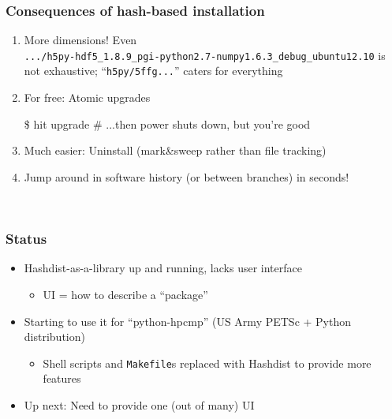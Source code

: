 \documentclass[sans,mathserif]{beamer}
\begin{document}
\begin{frame}[fragile]
  \frametitle{Consequences of hash-based installation}
  \begin{enumerate}
  \item<+-> More dimensions! Even \\
{\footnotesize
{\tt .../h5py-hdf5\_1.8.9\_pgi-python2.7-numpy1.6.3\_debug\_ubuntu12.10}
}
is not exhaustive; ``{\tt h5py/5ffg...}'' caters for everything

  \item<+-> For free: Atomic upgrades
\begin{semiverbatim}
\$ hit upgrade
# ...then power shuts down, but you're good
\end{semiverbatim}

  \item<+-> Much easier: Uninstall (mark\&sweep rather than file tracking)

  \item<+-> Jump around in software history (or between branches) in seconds!


  \end{enumerate}

~

\end{frame}


\begin{frame}
  \frametitle{Status}
  \begin{itemize}
  \item<+-> Hashdist-as-a-library up and running, lacks user interface
    \begin{itemize}
    \item UI = how to describe a ``package''
    \end{itemize}
  \item<+-> Starting to use it for ``python-hpcmp'' (US Army PETSc + Python distribution)
    \begin{itemize}
    \item Shell scripts and {\tt Makefile}s replaced with Hashdist to provide more features
    \end{itemize}
  \item<+-> Up next: Need to provide one (out of many) UI
  \end{itemize}
\end{frame}
\end{document}

